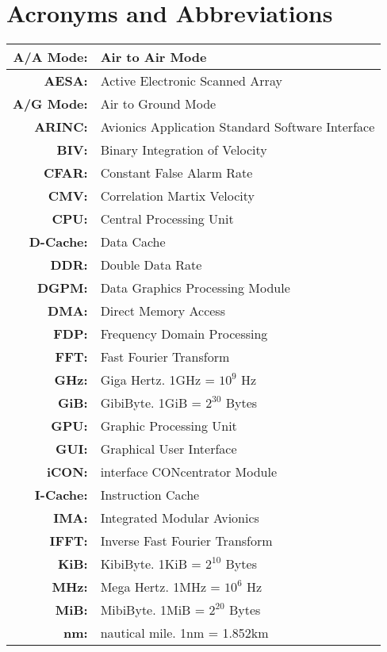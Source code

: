 \chapter*{Acronyms and Abbreviations}
\label{chap:acronyms}

\begin{center}
\begin{longtable}{|>{\bfseries}rl|}

\hline
A/A Mode: & Air to Air Mode \\ \hline
AESA: & Active Electronic Scanned Array \\ \hline
A/G Mode: & Air to Ground Mode \\ \hline
ARINC: & Avionics Application Standard Software Interface \\ \hline
BIV: & Binary Integration of Velocity \\ \hline
CFAR: & Constant False Alarm Rate \\ \hline
CMV: & Correlation Martix Velocity \\ \hline
CPU: & Central Processing Unit \\ \hline
D-Cache: & Data Cache \\ \hline
DDR: & Double Data Rate \\ \hline
DGPM: & Data Graphics Processing Module \\ \hline
DMA: & Direct Memory Access \\ \hline
FDP: & Frequency Domain Processing \\ \hline
FFT: & Fast Fourier Transform \\ \hline
GHz: & Giga Hertz. 1GHz = $10^{9}$ Hz \\ \hline
GiB: & GibiByte. 1GiB = $2^{30}$ Bytes \\ \hline
GPU: & Graphic Processing Unit \\ \hline
GUI: & Graphical User Interface \\ \hline
iCON: & interface CONcentrator Module \\ \hline
I-Cache: & Instruction Cache \\ \hline
IMA: & Integrated Modular Avionics \\ \hline
IFFT: & Inverse Fast Fourier Transform \\ \hline
KiB: & KibiByte. 1KiB = $2^{10}$ Bytes \\ \hline
MHz: & Mega Hertz. 1MHz = $10^{6}$ Hz  \\ \hline
MiB: & MibiByte. 1MiB = $2^{20}$ Bytes \\ \hline
nm: & nautical mile. 1nm = 1.852km \\ \hline

\end{longtable}
\end{center}
